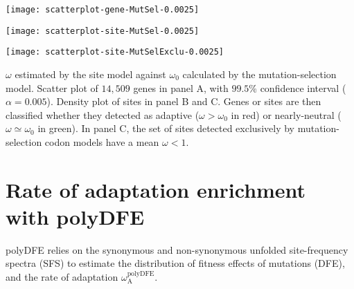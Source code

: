 \documentclass{article}
\begin{document}
    \begin{center}
        \begin{minipage}{0.32\linewidth}
            \texttt{[image: scatterplot-gene-MutSel-0.0025]}
        \end{minipage}
        \hfill
        \begin{minipage}{0.32\linewidth}
            \texttt{[image: scatterplot-site-MutSel-0.0025]}
        \end{minipage}
        \hfill
        \begin{minipage}{0.32\linewidth}
            \texttt{[image: scatterplot-site-MutSelExclu-0.0025]}
        \end{minipage}
        \hfill
    \end{center}

    $\omega$ estimated by the site model against $\omega_{0}$ calculated by the mutation-selection model.
    Scatter plot of $14,509$ genes in panel A, with $99.5$\% confidence interval ($\alpha=0.005$).
    Density plot of sites in panel B and C.
    Genes or sites are then classified whether they detected as adaptive ($\omega > \omega_{0}$ in red) or nearly-neutral ($\omega \simeq \omega_{0}$ in green).
    In panel C, the set of sites detected exclusively by mutation-selection codon models have a mean $\omega < 1 $.

    

    \section{Rate of adaptation enrichment with polyDFE}
    \label{sec:polyDFE}

    polyDFE\cite{tataru_polydfe_2020} relies on the synonymous and non-synonymous unfolded site-frequency spectra (SFS) to estimate the distribution of fitness effects of mutations (DFE), and the rate of adaptation $\omega_{\mathrm{A}}^{\mathrm{polyDFE}}$.

    
\end{document}
